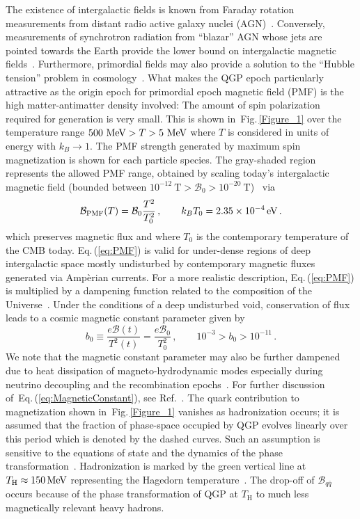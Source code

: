 \documentclass[epjST]{svjour}
\newcommand*{\MeV}{\text{\,MeV}}
\newcommand*{\eV}{\text{\,eV}}
\newcommand{\req}[1]{Eq.\,(\ref{#1})}
\newcommand{\rf}[1]{Fig.\,{\ref{#1}}}
\begin{document}
{\color{blue} The existence of intergalactic fields is known from Faraday rotation measurements from distant radio active galaxy nuclei (AGN)~\cite{Pomakov:2022cem}. Conversely, measurements of synchrotron radiation from ``blazar'' AGN whose jets are pointed towards the Earth provide the lower bound on intergalactic magnetic fields~\cite{Neronov:2010gir}. Furthermore, primordial fields may also provide a solution to the ``Hubble tension'' problem in cosmology~\cite{Jedamzik:2025cax}. What makes the QGP epoch particularly attractive as the origin epoch for primordial epoch magnetic field (PMF) is the high matter-antimatter density involved: The amount of spin polarization required for generation is very small. This is shown in~\rf{Figure_1} over the temperature range \(500\,\MeV>T>5\,\MeV\) where \(T\) is considered in units of energy with \(k_{B}\to 1\). The PMF strength generated by maximum spin magnetization is shown for each particle species. The gray-shaded region represents the allowed PMF range, obtained by scaling today’s intergalactic magnetic field (bounded between \(10^{-12}~\mathrm{T} > \mathcal{B}_{0} > 10^{-20}~\mathrm{T}\))~\cite{Pshirkov:2015tua,Planck:2015zrl,Jedamzik:2018itu} via
\begin{equation}
\label{eq:PMF}
\mathcal{B}_\mathrm{PMF}(T) = \mathcal{B}_{0}\frac{T^{2}}{T_{0}^{2}}\,,\qquad
k_{B}T_{0} = 2.35\times10^{-4}\eV\,.
\end{equation}
which preserves magnetic flux and where \(T_{0}\) is the contemporary temperature of the CMB today. \req{eq:PMF} is valid for under-dense regions of deep intergalactic space mostly undisturbed by contemporary magnetic fluxes generated via Amp{\`e}rian currents. For a more realistic description, \req{eq:PMF} is multiplied by a dampening function related to the composition of the Universe~\cite{Banerjee:2004df}. Under the conditions of a deep undisturbed void, conservation of flux leads to a cosmic magnetic constant parameter given by
\begin{equation}
\label{eq:MagneticConstant}
b_{0} \equiv \frac{e\mathcal{B}(t)}{T^{2}(t)}=\frac{e\mathcal{B}_{0}}{T_{0}^{2}}\,,\qquad
10^{-3} > b_{0} > 10^{-11}\,.
\end{equation}
We note that the magnetic constant parameter may also be further dampened due to heat dissipation of magneto-hydrodynamic modes especially during neutrino decoupling and the recombination epochs~\cite{Jedamzik:1996wp}. For further discussion of~\req{eq:MagneticConstant}, see Ref.~\cite{Steinmetz:2023nsc}. The quark contribution to magnetization shown in~\rf{Figure_1} vanishes as hadronization occurs; it is assumed that the fraction of phase-space occupied by QGP evolves linearly over this period which is denoted by the dashed curves. Such an assumption is sensitive to the equations of state and the dynamics of the phase transformation~\cite{Fromerth:2012fe}.} Hadronization is marked by the green vertical line at \(T_\mathrm{H}\approx150\MeV\) {\color{blue}representing the Hagedorn temperature~\cite{Hagedorn:1967dia,Rafelski:2015xej}.} The drop-off of \(\mathcal{B}_{q\bar{q}}\) occurs because of the phase transformation of QGP at \(T_\mathrm{H}\) to much less magnetically relevant heavy hadrons.
\end{document}
